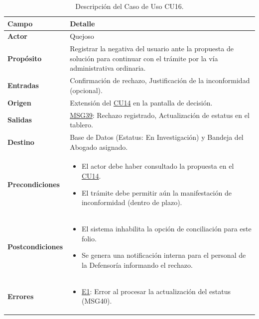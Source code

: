 \begin{appendices}
\begin{table}[htbp]
\centering
\small
{}
\begin{tabular}{|p{3.5cm}|p{10.5cm}|}
\hline
\rowcolor[HTML]{EFEFEF} 
\textbf{Campo} & \textbf{Detalle} \\ \hline
\textbf{Actor} & Quejoso \\ \hline
\textbf{Propósito} & Registrar la negativa del usuario ante la propuesta de solución para continuar con el trámite por la vía administrativa ordinaria. \\ \hline
\textbf{Entradas} & Confirmación de rechazo, Justificación de la inconformidad (opcional). \\ \hline
\textbf{Origen} & Extensión del \hyperlink{anexo:casos_uso}{CU14} en la pantalla de decisión. \\ \hline
\textbf{Salidas} & \hyperlink{msg:MSG39}{MSG39}: Rechazo registrado, Actualización de estatus en el tablero. \\ \hline
\textbf{Destino} & Base de Datos (Estatus: En Investigación) y Bandeja del Abogado asignado. \\ \hline
\textbf{Precondiciones} & 
\begin{itemize}[nosep, leftmargin=*]
    \item El actor debe haber consultado la propuesta en el \hyperlink{anexo:casos_uso}{CU14}.
    \item El trámite debe permitir aún la manifestación de inconformidad (dentro de plazo).
\end{itemize} \\ \hline
\textbf{Postcondiciones} & 
\begin{itemize}[nosep, leftmargin=*]
    \item El sistema inhabilita la opción de conciliación para este folio.
    \item Se genera una notificación interna para el personal de la Defensoría informando el rechazo.
\end{itemize} \\ \hline
\textbf{Errores} & 
\begin{itemize}[nosep, leftmargin=*]
    \item \hyperlink{err:E21}{E1}: Error al procesar la actualización del estatus (MSG40).
\end{itemize} \\ \hline
\end{tabular}
\caption{Descripción del Caso de Uso CU16.}
\label{tab:cu16_especificacion}
\end{table}


\end{appendices}
